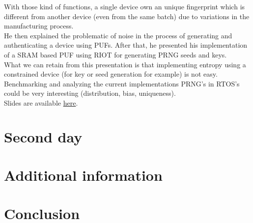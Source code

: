 \documentclass[journal, a4paper]{../IEEEtran}
\begin{document}
With those kind of functions, a single device own an unique fingerprint which is different from another device (even from the same batch) due to variations in the manufacturing process. \\

He then explained the problematic of noise in the process of generating and authenticating a device using PUFs.
After that, he presented his implementation of a SRAM based PUF using RIOT for generating PRNG seeds and keys. \\

What we can retain from this presentation is that implementing entropy using a constrained device (for key or seed generation for example) is not easy. \\
Benchmarking and analyzing the current implementations PRNG's in RTOS's could be very interesting (distribution, bias, uniqueness). \\

Slides are available \href{http://summit.riot-os.org/2018/wp-content/uploads/sites/10/2018/09/3_2-Peter-Kietzmann-Crypto-Fundamentals.pdf}{here}.

\section{Second day}


\section{Additional information}



\section{Conclusion}
\end{document}
